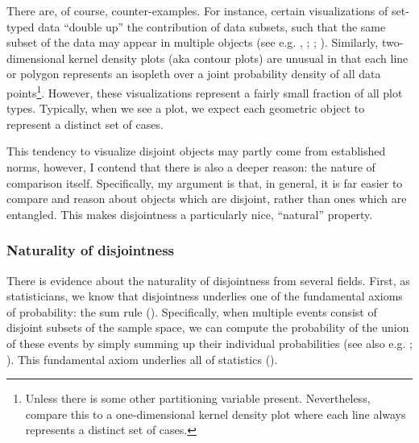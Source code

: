 \documentclass[
  openany]{book}
\theoremstyle{definition}
\theoremstyle{definition}
\theoremstyle{definition}
\theoremstyle{definition}
\theoremstyle{remark}
\begin{document}
There are, of course, counter-examples. For instance, certain visualizations of set-typed data ``double up'' the contribution of data subsets, such that the same subset of the data may appear in multiple objects (see e.g. , ; ; ). Similarly, two-dimensional kernel density plots (aka contour plots) are unusual in that each line or polygon represents an isopleth over a joint probability density of all data points\footnote{Unless there is some other partitioning variable present. Nevertheless, compare this to a one-dimensional kernel density plot where each line always represents a distinct set of cases.}. However, these visualizations represent a fairly small fraction of all plot types. Typically, when we see a plot, we expect each geometric object to represent a distinct set of cases.

This tendency to visualize disjoint objects may partly come from established norms, however, I contend that there is also a deeper reason: the nature of comparison itself. Specifically, my argument is that, in general, it is far easier to compare and reason about objects which are disjoint, rather than ones which are entangled. This makes disjointness a particularly nice, ``natural'' property.

\subsubsection{Naturality of disjointness}\label{naturality-of-disjointness}

There is evidence about the naturality of disjointness from several fields. First, as statisticians, we know that disjointness underlies one of the fundamental axioms of probability: the sum rule (). Specifically, when multiple events consist of disjoint subsets of the sample space, we can compute the probability of the union of these events by simply summing up their individual probabilities (see also e.g. ; ). This fundamental axiom underlies all of statistics ().
\end{document}
